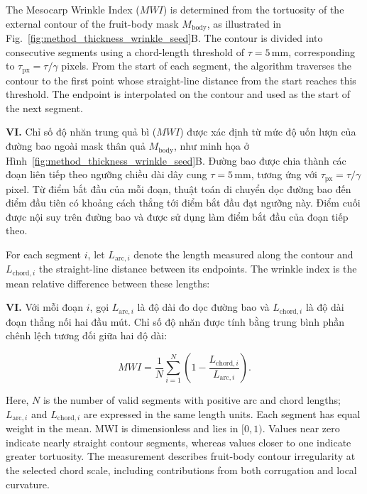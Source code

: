 \documentclass[final,1p,11pt,longtitle]{elsarticle}
\newenvironment{viet}{\par\smallskip\begingroup\color{viColor}\noindent\textbf{VI. }\ignorespaces}{\par\endgroup\smallskip}
\begin{document}
The Mesocarp Wrinkle Index ($MWI$) is determined from the tortuosity of the external contour of the fruit-body mask $M_{\mathrm{body}}$, as illustrated in Fig.~\ref{fig:method_thickness_wrinkle_seed}B. The contour is divided into consecutive segments using a chord-length threshold of $\tau=5\,\mathrm{mm}$, corresponding to $\tau_{\mathrm{px}}=\tau/\gamma$ pixels. From the start of each segment, the algorithm traverses the contour to the first point whose straight-line distance from the start reaches this threshold. The endpoint is interpolated on the contour and used as the start of the next segment.

\begin{viet}
Chỉ số độ nhăn trung quả bì ($MWI$) được xác định từ mức độ uốn lượn của đường bao ngoài mask thân quả $M_{\mathrm{body}}$, như minh họa ở Hình~\ref{fig:method_thickness_wrinkle_seed}B. Đường bao được chia thành các đoạn liên tiếp theo ngưỡng chiều dài dây cung $\tau=5\,\mathrm{mm}$, tương ứng với $\tau_{\mathrm{px}}=\tau/\gamma$ pixel. Từ điểm bắt đầu của mỗi đoạn, thuật toán di chuyển dọc đường bao đến điểm đầu tiên có khoảng cách thẳng tới điểm bắt đầu đạt ngưỡng này. Điểm cuối được nội suy trên đường bao và được sử dụng làm điểm bắt đầu của đoạn tiếp theo.
\end{viet}

For each segment $i$, let $L_{\mathrm{arc},i}$ denote the length measured along the contour and $L_{\mathrm{chord},i}$ the straight-line distance between its endpoints. The wrinkle index is the mean relative difference between these lengths:

\begin{viet}
Với mỗi đoạn $i$, gọi $L_{\mathrm{arc},i}$ là độ dài đo dọc đường bao và $L_{\mathrm{chord},i}$ là độ dài đoạn thẳng nối hai đầu mút. Chỉ số độ nhăn được tính bằng trung bình phần chênh lệch tương đối giữa hai độ dài:
\end{viet}

\begin{equation}
MWI=\frac{1}{N}\sum_{i=1}^{N}\left(1-\frac{L_{\mathrm{chord},i}}{L_{\mathrm{arc},i}}\right).
\end{equation}

Here, $N$ is the number of valid segments with positive arc and chord lengths; $L_{\mathrm{arc},i}$ and $L_{\mathrm{chord},i}$ are expressed in the same length units. Each segment has equal weight in the mean. MWI is dimensionless and lies in $[0,1)$. Values near zero indicate nearly straight contour segments, whereas values closer to one indicate greater tortuosity. The measurement describes fruit-body contour irregularity at the selected chord scale, including contributions from both corrugation and local curvature.
\end{document}
